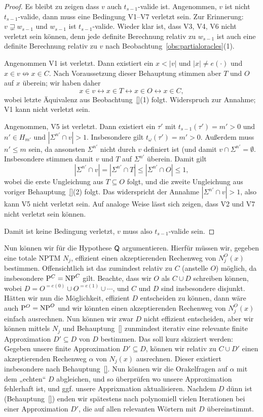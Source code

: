 \begin{proof}
    Es bleibt zu zeigen dass $v$ auch $t_{s-1}$-valide ist. Angenommen, $v$ ist nicht $t_{s-1}$-valide, dann muss eine Bedingung V1--V7 verletzt sein. Zur Erinnerung: $v\sqsupsetneq w_{s-1}$ und $w_{s-1}$ ist $t_{s-1}$-valide.
    Wieder klar ist, dass V3, V4, V6 nicht verletzt sein können, denn jede definite Berechnung relativ zu $w_{s-1}$ ist auch eine definite Berechnung relativ zu $v$ nach Beobachtung~\ref{obs:partialoracles}(1).

    Angenommen V1 ist verletzt. Dann existiert ein $x<|v|$ und $|x|\neq e(\cdot)$ und $x\in v \not\leftrightarrow x\in C$.
    Nach Voraussetzung dieser Behauptung stimmen aber $T$ und $O$ auf $x$ überein; wir haben daher
    \[ x\in v \leftrightarrow x\in T \leftrightarrow x\in O \leftrightarrow x\in C, \]
    wobei letzte Äquivalenz aus Beobachtung~\ref{}(1) folgt. Widerspruch zur Annahme; V1 kann nicht verletzt sein.

    Angenommen, V5 ist verletzt. Dann existiert ein $\tau'$ mit $t_{s-1}(\tau')=m'>0$ und $n'\in H_{m'}$ und $|\Sigma^{n'}\cap v|>1$. Insbesondere gilt $t_\omega(\tau')=m'>0$.
    Außerdem muss $n'\leq m$ sein, da ansonsten $\Sigma^{n'}$ nicht durch $v$ definiert ist (und damit $v\cap\Sigma^{n'}=\emptyset$.
    Insbesondere stimmen damit $v$ und $T$ auf $\Sigma^{n'}$ überein.
    Damit gilt
    \[ |\Sigma^{n'}\cap v|=|\Sigma^{n'}\cap T|\leq |\Sigma^{n'}\cap O| \leq 1, \]
    wobei die erste Ungleichung aus $T\subseteq O$ folgt, und die zweite Ungleichung aus voriger Behauptung~\ref{}(2) folgt.
    Das widerspricht der Annahme $|\Sigma^{n'}\cap v|>1$, also kann V5 nicht verletzt sein. Auf analoge Weise lässt sich zeigen, dass V2 und V7 nicht verletzt sein können.

    Damit ist keine Bedingung verletzt, $v$ muss also $t_{s-1}$-valide sein.
\end{proof}

Nun können wir für die Hypothese $\mathsf{Q}$ argumentieren.
Hierfür müssen wir, gegeben eine totale NPTM $N_j$, effizient einen akzeptierenden Rechenweg von $N_j^O(x)$ bestimmen.
Offensichtlich ist das zumindest relativ zu $C$ (anstelle $O$) möglich, da insbesondere $\mathrm{P}^C=\mathrm{NP}^C$ gilt.
Beachte, dass wir $O$ als $C\cup D$ schreiben können, wobei $D=O^{=e(0)}\cup O^{=e(1)}\cup\cdots$, und $C$ und $D$ sind insbesondere disjunkt.
Hätten wir nun die Möglichkeit, effizient $D$ entscheiden zu können, dann wäre auch $\mathrm{P}^{O}=\mathrm{NP}^{O}$ und wir könnten einen akzeptierenden Rechenweg von $N_j^O(x)$ einfach ausrechnen.
Nun können wir zwar $D$ nicht effizient entscheiden, aber wir können mittels $N_j$ und Behauptung~\ref{} zunmindest iterativ eine relevante finite Approximation $D'\subseteq D$ von $D$ bestimmen.
Das soll kurz skizziert werden: Gegeben unsere finite Approximation $D'\subseteq D$, können wir relativ zu $C\cup D'$ einen akzeptierenden Rechenweg $\alpha$ von $N_j(x)$ ausrechnen. Dieser existiert insbesondere nach Behauptung~\ref{}. Nun können wir die Orakelfragen auf $\alpha$ mit dem „echten“ $D$ abgleichen, und so überprüfen wo unsere Approximation fehlerhaft ist, und ggf. unsere Apprixmation aktualisieren. Nachdem $D$ dünn ist (Behauptung~\ref{}) enden wir spätestens nach polynomiell vielen Iterationen bei einer Approximation $D'$, die auf allen relevanten Wörtern mit $D$ übereinstimmt.


